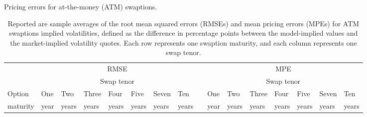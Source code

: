 \begin{sidewaystable}
\caption[Pricing Errors for ATM Swaptions]{ Pricing errors for at-the-money (ATM) swaptions.}
\caption*{Reported are sample averages of the root mean squared errors (RMSEs) and mean pricing
errors (MPEs) for ATM swaptions implied volatilities, defined as the difference in percentage points between the model-implied values and the market-implied volatility quotes. Each row represents one swaption maturity, and each column represents one swap tenor.}\label{tbl:Table2}
\vspace{0.2cm}
\setlength{\tabcolsep}{6pt}

\begin{tabular}{lrrrrrrrlrrrrrrr}
\toprule &
\multicolumn{7}{c}{RMSE} &&
\multicolumn{7}{c}{MPE} \\
 \cmidrule(l){2-9}  \cmidrule(l){10-16}
& \multicolumn{7}{c}{Swap tenor} &&
\multicolumn{7}{c}{Swap tenor} \\
 \cmidrule(l){2-9}  \cmidrule(l){10-16}
\multicolumn{1}{l}{{Option}} & \multicolumn{1}{l}{One} & \multicolumn{1}{l}{Two} & \multicolumn{1}{l}{Three} & \multicolumn{1}{l}{Four} &
\multicolumn{1}{l}{Five} & \multicolumn{1}{l}{Seven} & \multicolumn{1}{l}{Ten} & & \multicolumn{1}{l}{One} &  \multicolumn{1}{l}{Two} & \multicolumn{1}{l}{Three} & \multicolumn{1}{l}{Four} & \multicolumn{1}{l}{Five} & \multicolumn{1}{l}{Seven} & \multicolumn{1}{l}{Ten} \\

\multicolumn{1}{l}{maturity} & \multicolumn{1}{l}{year} & \multicolumn{1}{l}{years} & \multicolumn{1}{l}{years} & \multicolumn{1}{l}{years} &
\multicolumn{1}{l}{years} & \multicolumn{1}{l}{years} & \multicolumn{1}{l}{years} & & \multicolumn{1}{l}{year} &  \multicolumn{1}{l}{years} & \multicolumn{1}{l}{years} & \multicolumn{1}{l}{years} & \multicolumn{1}{l}{years} & \multicolumn{1}{l}{years} & \multicolumn{1}{l}{years} \\

\midrule


\end{tabular}
\end{sidewaystable}
